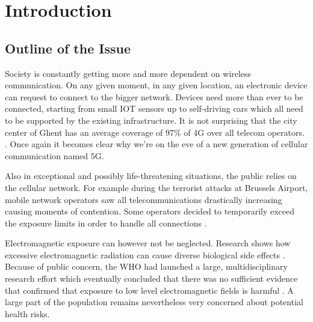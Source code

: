 \chapter{Introduction}
\label{chap:intro}

\section{Outline of the Issue} %
\label{sec:issue}

Society is constantly getting more and more dependent on wireless communication. On any given moment, in any given location, an electronic device
can request to connect to the bigger network. Devices need more than ever to be connected, starting from small \gls{IOT} sensors up to self-driving cars
which all need to be supported by the existing infrastructure. 
It is not surprising that the city center of Ghent has an average coverage of 97\% of 4G over all telecom operators.
\cite{testaankoop}. Once again it becomes clear why we're on the eve of a new generation of cellular communication named 5G. 

Also in exceptional and possibly life-threatening situations, the public relies on the cellular network. For example during the terrorist attacks at Brussels Airport,
mobile network operators saw all telecommunications drastically increasing causing moments of contention. Some operators decided to temporarily exceed the exposure limits in
order to handle all connections \cite{baseZaventem}.

Electromagnetic exposure can however not be neglected. Research shows how excessive electromagnetic radiation can cause diverse biological side effects \cite{bioeffects}.
Because of public concern, the \gls{WHO} had launched a large, multidisciplinary research effort which eventually concluded that there was no sufficient evidence that confirmed 
that exposure to low level electromagnetic fields is harmful \cite{WHO}. A large part of the population remains nevertheless very concerned about potential health risks.

